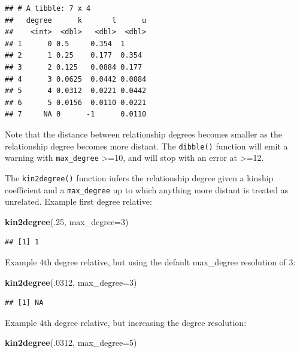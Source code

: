 \documentclass[9pt,a4paper,]{extarticle}
\newenvironment{Shaded}{\begin{snugshade}}{\end{snugshade}}
\newcommand{\DataTypeTok}[1]{\textcolor[rgb]{0.13,0.29,0.53}{#1}}
\newcommand{\DecValTok}[1]{\textcolor[rgb]{0.00,0.00,0.81}{#1}}
\newcommand{\KeywordTok}[1]{\textcolor[rgb]{0.13,0.29,0.53}{\textbf{#1}}}
\newcommand{\NormalTok}[1]{#1}
\begin{document}
\begin{verbatim}
## # A tibble: 7 x 4
##   degree      k       l      u
##    <int>  <dbl>   <dbl>  <dbl>
## 1      0 0.5     0.354  1     
## 2      1 0.25    0.177  0.354 
## 3      2 0.125   0.0884 0.177 
## 4      3 0.0625  0.0442 0.0884
## 5      4 0.0312  0.0221 0.0442
## 6      5 0.0156  0.0110 0.0221
## 7     NA 0      -1      0.0110
\end{verbatim}

Note that the distance between relationship degrees becomes smaller as the relationship degree becomes more distant. The \texttt{dibble()} function will emit a warning with \texttt{max\_degree} \textgreater=10, and will stop with an error at \textgreater=12.

The \texttt{kin2degree()} function infers the relationship degree given a kinship coefficient and a \texttt{max\_degree} up to which anything more distant is treated as unrelated. Example first degree relative:

\begin{Shaded}
\begin{Highlighting}[]
\KeywordTok{kin2degree}\NormalTok{(.}\DecValTok{25}\NormalTok{, }\DataTypeTok{max_degree=}\DecValTok{3}\NormalTok{)}
\end{Highlighting}
\end{Shaded}

\begin{verbatim}
## [1] 1
\end{verbatim}

Example 4th degree relative, but using the default max\_degree resolution of 3:

\begin{Shaded}
\begin{Highlighting}[]
\KeywordTok{kin2degree}\NormalTok{(.}\DecValTok{0312}\NormalTok{, }\DataTypeTok{max_degree=}\DecValTok{3}\NormalTok{)}
\end{Highlighting}
\end{Shaded}

\begin{verbatim}
## [1] NA
\end{verbatim}

Example 4th degree relative, but increasing the degree resolution:

\begin{Shaded}
\begin{Highlighting}[]
\KeywordTok{kin2degree}\NormalTok{(.}\DecValTok{0312}\NormalTok{, }\DataTypeTok{max_degree=}\DecValTok{5}\NormalTok{)}
\end{Highlighting}
\end{Shaded}
\end{document}
